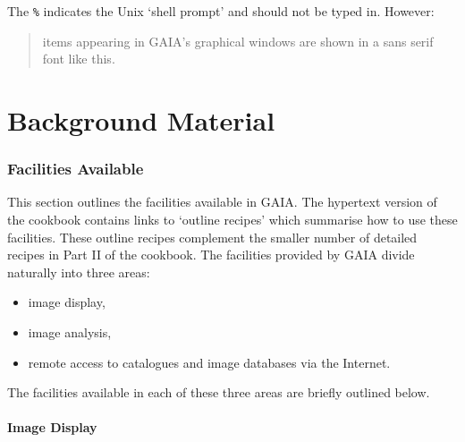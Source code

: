 \documentclass[twoside,11pt]{starlink}
\begin{document}
\begin{terminalv}
\end{terminalv}

The \texttt{\%} indicates the Unix `shell prompt' and should not be
typed in.  However:

\begin{quote}
\textsf{items appearing in GAIA's graphical windows are shown in a sans
serif font like this.}
\end{quote}


\cleardoublepage

\part{Background Material}


\section{\label{FACIL}Facilities Available}

This section outlines the facilities available in GAIA.  The hypertext
version of the cookbook contains links to `outline recipes' which
summarise how to use these facilities.  These outline recipes complement
the smaller number of detailed recipes in Part II of the cookbook.
The facilities provided by GAIA divide naturally into three areas:

\begin{itemize}

  \item image display,

  \item image analysis,

  \item remote access to catalogues and image databases via the Internet.

\end{itemize}

The facilities available in each of these three areas are briefly outlined
below.

\subsection{Image Display}
\end{document}
